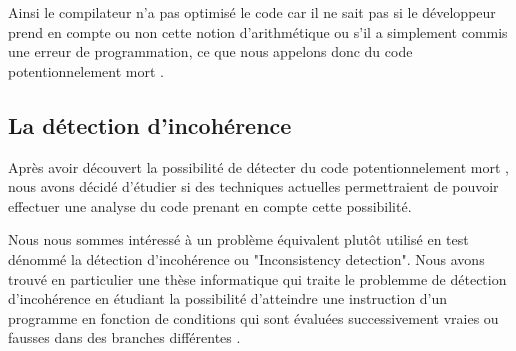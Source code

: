 Ainsi le compilateur n'a pas optimisé le code car il ne sait pas si le développeur prend en compte ou non cette notion d'arithmétique ou s'il a simplement commis une erreur de programmation, ce que nous appelons donc du code \og potentionnelement mort \fg{}.

\subsection{La détection d'incohérence}

Après avoir découvert la possibilité de détecter du code \og potentionnelement mort \fg{}, nous avons décidé d'étudier si des techniques actuelles permettraient de pouvoir effectuer une analyse du code prenant en compte cette possibilité.

Nous nous sommes intéressé à un problème équivalent plutôt utilisé en test dénommé la détection d'incohérence ou "Inconsistency detection". Nous avons trouvé en particulier une thèse informatique qui traite le problemme de détection d'incohérence en étudiant la possibilité d'atteindre une instruction d'un programme en fonction de conditions qui sont évaluées successivement vraies ou fausses dans des branches différentes \cite{inconsistencies}.

